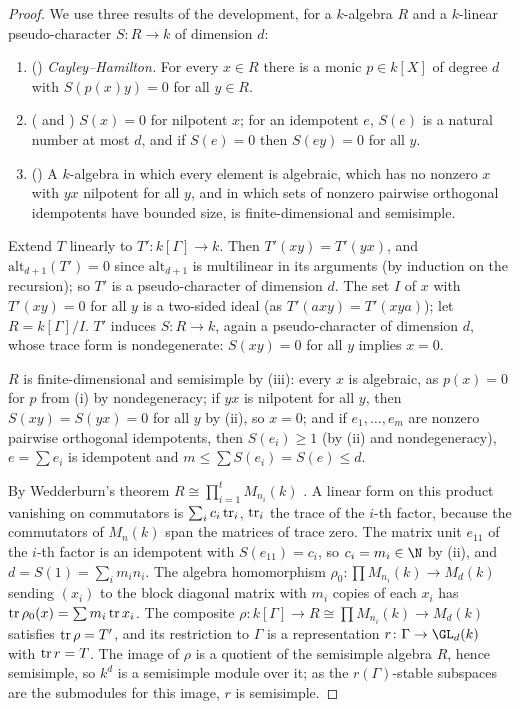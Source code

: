 \begin{proof}
We use three results of the development, for a $k$-algebra $R$ and a $k$-linear pseudo-character $S\colon R\to k$ of
dimension $d$:
\begin{enumerate}[label=(\roman*),nosep]
\item () \emph{Cayley--Hamilton.} For every $x\in R$ there is a monic $p\in
  k[X]$ of degree $d$ with $S(p(x)y)=0$ for all $y\in R$.
\item ( and )
  $S(x)=0$ for nilpotent $x$; for an idempotent $e$, $S(e)$ is a natural number at most $d$, and if $S(e)=0$ then $S(ey)=0$
  for all $y$.
\item () A $k$-algebra in which
  every element is algebraic, which has no nonzero $x$ with $yx$ nilpotent for all $y$, and in which sets of nonzero
  pairwise orthogonal idempotents have bounded size, is finite-dimensional and semisimple.
\end{enumerate}
Extend $T$ linearly to $T'\colon k[\Gamma]\to k$. Then $T'(xy)=T'(yx)$, and $\mathrm{alt}_{d+1}(T')=0$ since
$\mathrm{alt}_{d+1}$ is multilinear in its arguments (by induction on the recursion); so $T'$ is a pseudo-character of
dimension $d$. The set $I$ of $x$ with $T'(xy)=0$ for all $y$ is a two-sided ideal (as $T'(axy)=T'(xya)$); let
$R=k[\Gamma]/I$. $T'$ induces $S\colon R\to k$, again a pseudo-character of dimension $d$, whose trace form is
nondegenerate: $S(xy)=0$ for all $y$ implies $x=0$.

$R$ is finite-dimensional and semisimple by (iii): every $x$ is algebraic, as $p(x)=0$ for $p$ from (i) by nondegeneracy;
if $yx$ is nilpotent for all $y$, then $S(xy)=S(yx)=0$ for all $y$ by (ii), so $x=0$; and if $e_1,\dots,e_m$ are nonzero
pairwise orthogonal idempotents, then $S(e_i)\ge1$ (by (ii) and nondegeneracy), $e=\sum e_i$ is idempotent and
$m\le\sum S(e_i)=S(e)\le d$.

By Wedderburn's theorem $R\cong\prod_{i=1}^tM_{n_i}(k)$ \cite{CurtisReiner1962}. A linear form on this product vanishing on
commutators is $\sum_ic_i\operatorname{tr}_i$, $\operatorname{tr}_i$ the trace of the $i$-th factor, because the commutators of $M_{n}(k)$
span the matrices of trace zero. The matrix unit $e_{11}$ of the $i$-th factor is an idempotent with $S(e_{11})=c_i$, so
$c_i=m_i\in\N$ by (ii), and $d=S(1)=\sum_im_in_i$. The algebra homomorphism $\rho_0\colon\prod M_{n_i}(k)\to M_d(k)$
sending $(x_i)$ to the block diagonal matrix with $m_i$ copies of each $x_i$ has $\operatorname{tr}\rho_0(x)=\sum m_i\operatorname{tr} x_i$.
The composite $\rho\colon k[\Gamma]\to R\cong\prod M_{n_i}(k)\to M_d(k)$ satisfies $\operatorname{tr}\rho=T'$, and its restriction
to $\Gamma$ is a representation $r\colon\Gamma\to\GL_d(k)$ with $\operatorname{tr} r=T$. The image of $\rho$ is a quotient of the
semisimple algebra $R$, hence semisimple, so $k^d$ is a semisimple module over it; as the $r(\Gamma)$-stable subspaces are
the submodules for this image, $r$ is semisimple.
\end{proof}

